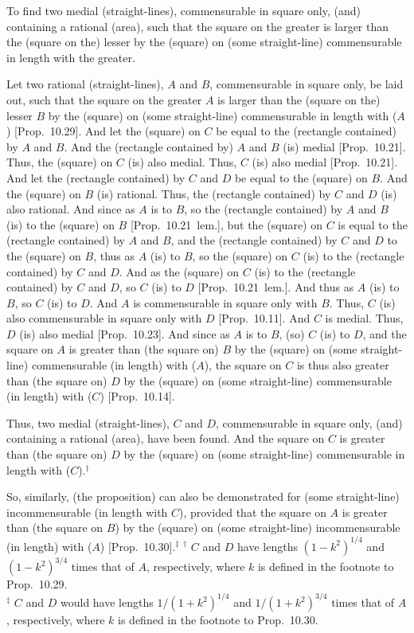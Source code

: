 To find two medial (straight-lines),
commensurable in square only, (and) containing a rational (area), such that
the square on the greater is larger than the (square on the) lesser by the
(square) on (some straight-line) commensurable in length with the greater.

\epsfysize=1.6in
\centerline{}

Let two rational (straight-lines), $A$ and $B$, commensurable in square only, 
be laid out, such that the square on the greater $A$ is larger than the (square on
the) lesser $B$ by the (square) on (some straight-line) commensurable
in length with ($A$) [Prop.~10.29]. And let the
(square) on $C$ be equal to the (rectangle contained) by $A$ and $B$.
And the (rectangle contained by) $A$ and $B$ (is) medial [Prop.~10.21]. Thus, the (square) on $C$ (is)
also medial. Thus, $C$ (is) also medial [Prop.~10.21]. And let the (rectangle contained) by $C$ and $D$
be equal to the (square) on $B$. And the (square)
on $B$ (is) rational. Thus, the (rectangle contained) by $C$ and $D$ (is)
also rational. And since as $A$ is to $B$, so the (rectangle contained) by
$A$ and $B$ (is) to the (square) on $B$ [Prop.~10.21~lem.], but the (square) on $C$
is equal to the (rectangle contained) by $A$ and $B$,  
and the (rectangle contained) by $C$ and $D$ to the (square) on
$B$, thus as $A$ (is) to $B$,
so the (square) on $C$ (is) to the (rectangle contained) by $C$ and $D$.
And as the (square) on $C$ (is) to the (rectangle contained) by $C$ and $D$,
so $C$ (is) to $D$ [Prop.~10.21~lem.].
And thus as $A$ (is) to $B$, so $C$ (is) to $D$. And $A$ is commensurable
in square only with $B$. Thus, $C$ (is) also commensurable in square
only with $D$ [Prop.~10.11]. And $C$ is medial.
Thus, $D$ (is) also medial [Prop.~10.23]. 
And since as $A$ is to $B$, (so) $C$ (is) to $D$, and the square on $A$
is greater than (the square on) $B$ by the (square) on (some straight-line)
commensurable (in length) with ($A$), the square on $C$
is thus also greater than (the square on) $D$ by the (square) on (some straight-line)
commensurable (in length) with ($C$) [Prop.~10.14]. 

Thus, two medial (straight-lines), $C$ and $D$, 
commensurable in square only, (and) containing a rational (area), have been found. And the square on $C$ is greater than (the square on) $D$ by the
(square) on (some straight-line) commensurable in length with ($C$).$^\dag$

So, similarly, (the proposition) can also be demonstrated for  (some straight-line) incommensurable
(in length with $C$), provided that the square on $A$ is greater than (the square on $B$) by the (square) on (some straight-line) incommensurable (in length) with ($A$) [Prop.~10.30].$^\ddag$
{\footnotesize\noindent$^\dag$ $C$ and $D$ have lengths $(1-k^2)^{1/4}$ and $(1-k^2)^{3/4}$ times that of $A$, respectively, where $k$ is defined in the
footnote to Prop.~10.29.\\[0.5ex]
$^\ddag$ $C$ and $D$ would have lengths $1/(1+k^2)^{1/4}$ and $1/(1+k^2)^{3/4}$ times that of $A$, respectively, where $k$ is defined in the footnote to  Prop.~10.30.}

